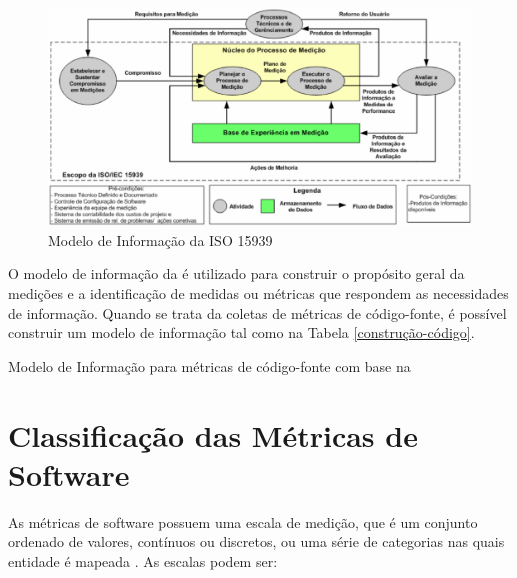 \begin{figure}[h!]
\centering
	\includegraphics[keepaspectratio=true,scale=0.3]{figuras/processo15939.eps}
	\caption{Modelo de Informação da ISO 15939}
	\label{informação}
\end{figure}
\FloatBarrier

O modelo de informação da  é utilizado para construir o 
propósito geral da medições e a identificação de medidas ou métricas que 
respondem as necessidades de informação. Quando se trata da coletas de métricas de código-fonte, é possível construir um modelo de informação tal como na Tabela \ref{construção-código}.

	\begin{table}[!ht]
	\begin{center}
	
	 
	\caption{Modelo de Informação para métricas de código-fonte com base na 
	}
	\label{construção-código}
	\end{center}
	\end{table}		


\section{Classificação das Métricas de Software}	
\label{Classificação das Métricas de Software}

As métricas de software possuem uma escala de medição, que é um conjunto 
ordenado de valores, contínuos ou discretos, ou uma série de categorias nas 
quais entidade é mapeada \cite{ISO:15939}. As escalas podem ser:

